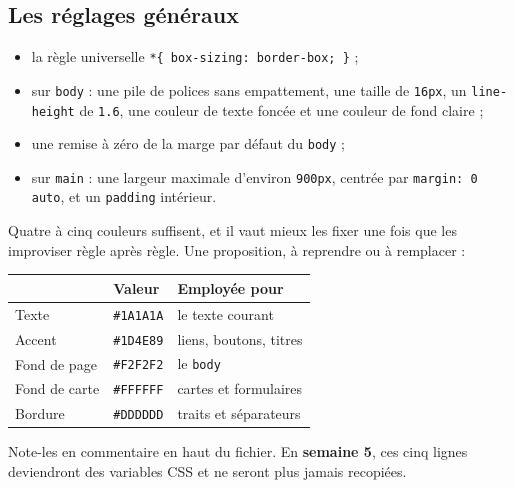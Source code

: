 \documentclass[a4paper,11pt]{article}
\newcommand{\hdr}[1]{\multicolumn{1}{l}{\color{white}\bfseries #1}}
\renewcommand{\arraystretch}{1.3}
\begin{document}
\subsection{Les réglages généraux}

\begin{tcolorbox}[definition, title={À produire dans la section 1}]
\begin{itemize}
  \item la règle universelle \texttt{*\{ box-sizing: border-box; \}} ;
  \item sur \texttt{body} : une pile de polices sans empattement, une taille de \texttt{16px}, un \texttt{line-height} de \texttt{1.6}, une couleur de texte foncée et une couleur de fond claire ;
  \item une remise à zéro de la marge par défaut du \texttt{body} ;
  \item sur \texttt{main} : une largeur maximale d'environ \texttt{900px}, centrée par \texttt{margin: 0 auto}, et un \texttt{padding} intérieur.
\end{itemize}
\end{tcolorbox}

\begin{tcolorbox}[astuce, title={Choisis ta palette maintenant, note-la en commentaire}]
Quatre à cinq couleurs suffisent, et il vaut mieux les fixer une fois que les improviser règle après règle. Une proposition, à reprendre ou à remplacer :

\vspace{4pt}
\begin{center}
\renewcommand{\arraystretch}{1.0}
\begin{tabularx}{0.94\linewidth}{p{2.6cm}p{2.2cm}X}
  \toprule
  \rowcolor{uniNavy}
  \hdr{Rôle} & \hdr{Valeur} & \hdr{Employée pour} \\
  \midrule
  \rowcolor{uniPaper}
  Texte & \texttt{\#1A1A1A} & le texte courant \\
  Accent & \texttt{\#1D4E89} & liens, boutons, titres \\
  \rowcolor{uniPaper}
  Fond de page & \texttt{\#F2F2F2} & le \texttt{body} \\
  Fond de carte & \texttt{\#FFFFFF} & cartes et formulaires \\
  \rowcolor{uniPaper}
  Bordure & \texttt{\#DDDDDD} & traits et séparateurs \\
  \bottomrule
\end{tabularx}
\end{center}

\vspace{4pt}
Note-les en commentaire en haut du fichier. En \textbf{semaine 5}, ces cinq lignes deviendront des variables CSS et ne seront plus jamais recopiées.
\end{tcolorbox}
\end{document}
